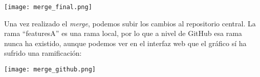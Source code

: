 \begin{center}
    \texttt{[image: merge\_final.png]}
\end{center}

Una vez realizado el \textit{merge}, podemos subir los cambios al repositorio central. La rama “featuresA” es una rama local, por lo que a nivel de GitHub esa rama nunca ha existido, aunque podemos ver en el interfaz web que el gráfico sí ha sufrido una ramificación:

\begin{center}
    \texttt{[image: merge\_github.png]}
\end{center}